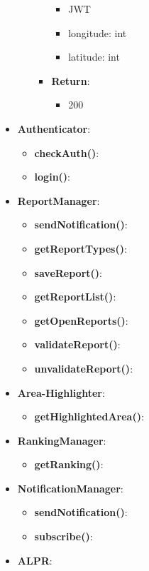 \documentclass{article}
\begin{document}
\begin{itemize}
\begin{itemize}
\begin{itemize}
						\begin{itemize}
							\item JWT
							\item longitude: int
							\item latitude: int
						\end{itemize}
					\item \textbf{Return}:
						\begin{itemize}
							\item 200
						\end{itemize}
				\end{itemize}
		\end{itemize}
	\item \textbf{Authenticator}:
		\begin{itemize}
			\item \textbf{checkAuth()}:
			\item \textbf{login()}:
		\end{itemize}
	\item \textbf{ReportManager}:
		\begin{itemize}
			\item \textbf{sendNotification()}:
			\item \textbf{getReportTypes()}:
			\item \textbf{saveReport()}:
			\item \textbf{getReportList()}:
			\item \textbf{getOpenReports()}:
			\item \textbf{validateReport()}:
			\item \textbf{unvalidateReport()}:
		\end{itemize}
	\item \textbf{Area-Highlighter}: 
		\begin{itemize}
			\item \textbf{getHighlightedArea()}:
		\end{itemize}
	\item \textbf{RankingManager}: 
		\begin{itemize}
			\item \textbf{getRanking()}:
		\end{itemize}
	\item \textbf{NotificationManager}:
		\begin{itemize}
			\item \textbf{sendNotification()}:
			\item \textbf{subscribe()}:
		\end{itemize}
	\item \textbf{ALPR}:

\end{itemize}
\end{document}
